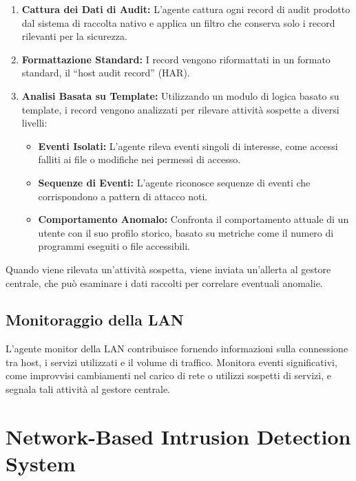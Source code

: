 \begin{enumerate}
    \item \textbf{Cattura dei Dati di Audit:} L'agente cattura ogni record di audit prodotto dal sistema di raccolta nativo e applica un filtro che conserva solo i record rilevanti per la sicurezza.
    
    \item \textbf{Formattazione Standard:} I record vengono riformattati in un formato standard, il ``host audit record'' (HAR).
    
    \item \textbf{Analisi Basata su Template:} Utilizzando un modulo di logica basato su template, i record vengono analizzati per rilevare attività sospette a diversi livelli:
    \begin{itemize}
        \item \textbf{Eventi Isolati:} L'agente rileva eventi singoli di interesse, come accessi falliti ai file o modifiche nei permessi di accesso.
        \item \textbf{Sequenze di Eventi:} L'agente riconosce sequenze di eventi che corrispondono a pattern di attacco noti.
        \item \textbf{Comportamento Anomalo:} Confronta il comportamento attuale di un utente con il suo profilo storico, basato su metriche come il numero di programmi eseguiti o file accessibili.
    \end{itemize}
\end{enumerate}

Quando viene rilevata un'attività sospetta, viene inviata un'allerta al gestore centrale, che può esaminare i dati raccolti per correlare eventuali anomalie.

\subsection{Monitoraggio della LAN}

L'agente monitor della LAN contribuisce fornendo informazioni sulla connessione tra host, i servizi utilizzati e il volume di traffico. Monitora eventi significativi, come improvvisi cambiamenti nel carico di rete o utilizzi sospetti di servizi, e segnala tali attività al gestore centrale.

\section{Network-Based Intrusion Detection System}

